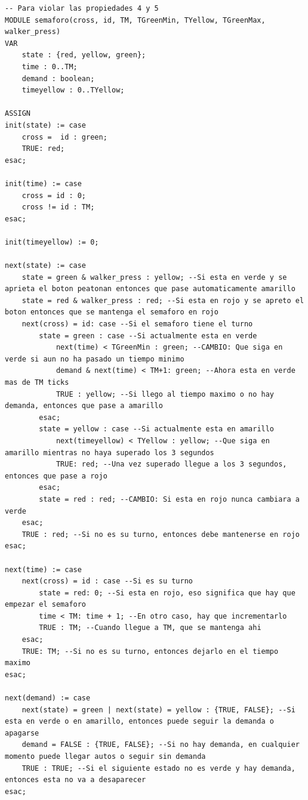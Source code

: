 \begin{lstlisting}[language=NuSMV, caption={Modelo con errores introducidos para violar specs 4 y 5}]
-- Para violar las propiedades 4 y 5
MODULE semaforo(cross, id, TM, TGreenMin, TYellow, TGreenMax, walker_press)
VAR
    state : {red, yellow, green};
    time : 0..TM;
    demand : boolean;
    timeyellow : 0..TYellow;

ASSIGN
init(state) := case
    cross =  id : green;
    TRUE: red;
esac;

init(time) := case
    cross = id : 0;
    cross != id : TM;
esac;

init(timeyellow) := 0;

next(state) := case
    state = green & walker_press : yellow; --Si esta en verde y se aprieta el boton peatonan entonces que pase automaticamente amarillo
    state = red & walker_press : red; --Si esta en rojo y se apreto el boton entonces que se mantenga el semaforo en rojo
    next(cross) = id: case --Si el semaforo tiene el turno
        state = green : case --Si actualmente esta en verde
            next(time) < TGreenMin : green; --CAMBIO: Que siga en verde si aun no ha pasado un tiempo minimo
            demand & next(time) < TM+1: green; --Ahora esta en verde mas de TM ticks
            TRUE : yellow; --Si llego al tiempo maximo o no hay demanda, entonces que pase a amarillo
        esac;
        state = yellow : case --Si actualmente esta en amarillo
            next(timeyellow) < TYellow : yellow; --Que siga en amarillo mientras no haya superado los 3 segundos
            TRUE: red; --Una vez superado llegue a los 3 segundos, entonces que pase a rojo
        esac;
        state = red : red; --CAMBIO: Si esta en rojo nunca cambiara a verde
    esac;
    TRUE : red; --Si no es su turno, entonces debe mantenerse en rojo
esac;

next(time) := case
    next(cross) = id : case --Si es su turno
        state = red: 0; --Si esta en rojo, eso significa que hay que empezar el semaforo
        time < TM: time + 1; --En otro caso, hay que incrementarlo
        TRUE : TM; --Cuando llegue a TM, que se mantenga ahi
    esac;
    TRUE: TM; --Si no es su turno, entonces dejarlo en el tiempo maximo
esac;

next(demand) := case 
    next(state) = green | next(state) = yellow : {TRUE, FALSE}; --Si esta en verde o en amarillo, entonces puede seguir la demanda o apagarse
    demand = FALSE : {TRUE, FALSE}; --Si no hay demanda, en cualquier momento puede llegar autos o seguir sin demanda
    TRUE : TRUE; --Si el siguiente estado no es verde y hay demanda, entonces esta no va a desaparecer
esac;


\end{lstlisting}
